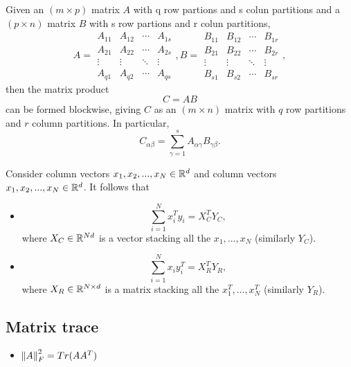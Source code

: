\begin{refsection}
\begin{lemma}
Given an $(m\times p)$ matrix $A$ with q row partions and s colun partitions and a $(p\times n)$ matrix $B$ with s row partions and r colun partitions,
$$A= \begin{matrix}
A_{11} & A_{12} & \cdots & A_{1s}\\ 
A_{21} & A_{22} & \cdots & A_{2s}\\ 
\vdots & \vdots & \ddots & \vdots\\ 
A_{q1} & A_{q2} & \cdots & A_{qs}
\end{matrix}, B = \begin{matrix}
B_{11} & B_{12} & \cdots & B_{1r}\\ 
B_{21} & B_{22} & \cdots & B_{2r}\\ 
\vdots & \vdots & \ddots & \vdots\\ 
B_{s1} & B_{s2} & \cdots & B_{sr}
\end{matrix},$$
then the matrix product $$C = AB$$
can be formed blockwise, giving $C$ as an $(m\times n)$ matrix with $q$ row partitions and $r$ column partitions. 
In particular, 
$$C_{\alpha \beta} = \sum_{\gamma = 1}^{s} A_{\alpha \gamma} B_{\gamma \beta}.$$
	
\end{lemma}


\begin{lemma}\label{appendix:SumVectorProductToMatrixProduct}
Consider column vectors $x_1,x_2,...,x_N \in \mathbb{R}^d$ and column vectors 	$x_1,x_2,...,x_N \in \mathbb{R}^d$. 
It follows that
\begin{itemize}
	\item $$\sum_{i=1}^N x^T_iy_i = X_C^TY_C,$$
	where $X_C \in \mathbb{R}^{Nd}$ is a vector stacking all the $x_1,...,x_N$ (similarly $Y_C$).
	\item $$\sum_{i=1}^N x_iy_i^T = X_R^TY_R,$$
	where $X_R \in \mathbb{R}^{N\times d}$ is a matrix stacking all the $x_1^T,...,x_N^T$ (similarly $Y_R$).
\end{itemize}
\end{lemma}


\subsection{Matrix trace}


\begin{lemma}
	\begin{itemize}
		\item $\norm{A}_F^2 = Tr(AA^T)$
	\end{itemize}
\end{lemma}



\end{refsection}
